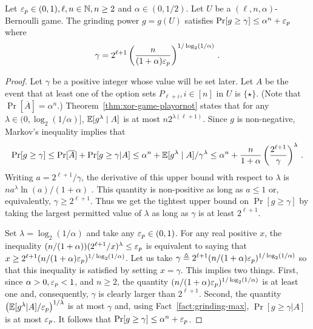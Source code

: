     \begin{lemma}\label{lemma:xor-game-Bernoulli-gamma}
        Let $\mathsf{\varepsilon}_p \in (0,1), \ell, n \in \mathbb{N}, n \geq 2$ and 
        $\alpha \in (0, 1/2)$.
        Let $U$ be a $(\ell, n, \alpha)$-Bernoulli game. 
        The grinding power $g = g(U)$ 
        satisfies $\Pr[g \geq \gamma] \leq \alpha^n + \mathsf{\varepsilon}_p$ where 
        \begin{align}\label{eq:bernoulli-game-gamma}
            \gamma = 2^{\ell + 1} \left(
                \frac{n}{(1+\alpha)\mathsf{\varepsilon}_p}
            \right)^{1/\log_2(1/\alpha)}
            \,.
        \end{align}
    \end{lemma}
    \begin{proof}
        Let $\gamma$ be a positive integer whose value will be set later.
        Let $A$ be the event that 
        at least one of the option sets $P_{\ell + i}, i \in [n]$ in $U$ is $\{\star\}$. 
        (Note that $\Pr[\overline{A}] = \alpha^n$.)
        Theorem~\ref{thm:xor-game-playornot} states that 
        for any $\lambda \in (0, \log_2(1/\alpha)]$, 
        $\operatorname{\mathbb{E}} [g^\lambda \mid A]$ is at most $n 2^{\lambda(\ell + 1)}$. 
        Since $g$ is non-negative, 
        Markov's inequality implies that 
        $$
        \Pr[g \geq \gamma] 
        \leq \Pr[\overline{A}] + \Pr[g \geq \gamma | A]
        \leq \alpha^n  + \operatorname{\mathbb{E}}[g^\lambda \mid A]/\gamma^\lambda
        \leq \alpha^n  + \frac{n}{1+\alpha} 
            \left(\frac{2^{\ell + 1}}{\gamma}\right)^\lambda
        \,.$$ 
        Writing $a = 2^{\ell + 1}/\gamma$, 
        the derivative of this upper bound with respect to $\lambda$ is 
        $n a^\lambda \ln(a) / (1+\alpha)$ . 
        This quantity is non-positive as long as $a \leq 1$ or, equivalently, 
        $\gamma \geq 2^{\ell + 1}$. 
        Thus we get the tightest upper bound on $\Pr[g \geq \gamma]$ 
        by taking the largest permitted value of $\lambda$ 
        as long as $\gamma$ is at least $2^{\ell + 1}$. 
        
        Set $\lambda = \log_2(1/\alpha)$ and take any $\mathsf{\varepsilon}_p \in (0,1)$. 
        For any real positive $x$, 
        the inequality $(n/(1+\alpha)) (2^{\ell + 1}/x)^\lambda \leq \mathsf{\varepsilon}_p$ 
        is equivalent to saying that 
        $x \geq 2^{\ell + 1} (n/(1+\alpha)\mathsf{\varepsilon}_p)^{1/\log_2(1/\alpha)}$. 
        Let us take 
        $\gamma \triangleq 2^{\ell + 1} (n/(1+\alpha)\mathsf{\varepsilon}_p)^{1/\log_2(1/\alpha)}$ 
        so that this inequality is satisfied by setting $x = \gamma$. 
        This implies two things. 
        First, 
        since $\alpha > 0, \mathsf{\varepsilon}_p < 1$, and $n \geq 2$, 
        the quantity  $(n/(1+\alpha)\mathsf{\varepsilon}_p)^{1/\log_2(1/\alpha)}$ is at least one and, consequently, 
        $\gamma$ is clearly larger than $2^{\ell + 1}$. 
        Second, 
        the quantity 
        $\left( \operatorname{\mathbb{E}}[g^\lambda | A]/\mathsf{\varepsilon}_p \right)^{1/\lambda}$ is at most $\gamma$ 
        and, using Fact~\ref{fact:grinding-max}, 
        $\Pr[g \geq \gamma | A]$ is at most $\mathsf{\varepsilon}_p$. 
        It follows that $\Pr[g \geq \gamma] \leq \alpha^n + \mathsf{\varepsilon}_p$.
    \end{proof}

